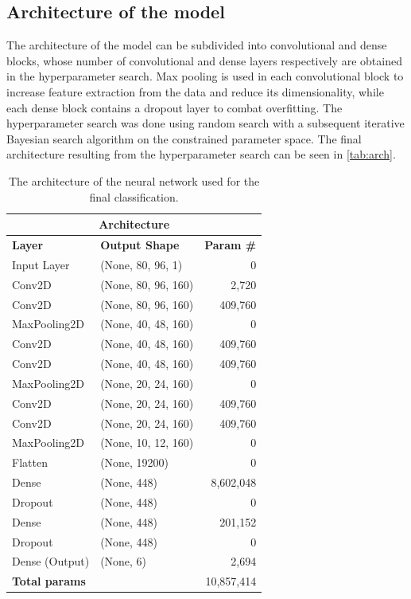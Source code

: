 \subsection{Architecture of the model}
\label{sec:keinbockmehr}
The architecture of the model can be subdivided into convolutional and dense blocks, whose number of convolutional and dense layers respectively are obtained in the hyperparameter search. Max pooling is used in each convolutional block to increase feature extraction from the data and reduce its dimensionality, while each dense block contains a dropout layer to combat overfitting. The hyperparameter search was done using random search with a subsequent iterative Bayesian search algorithm on the constrained parameter space. The final architecture resulting from the hyperparameter search can be seen in \autoref{tab:arch}.
\begin{table}[H]
    \caption{The architecture of the neural network used for the final classification.}
    \vspace{0.2cm}
    \label{tab:arch}
    \centering
    \begin{adjustbox}{max width=\textwidth}
    \begin{tabular}{l|l|r}
        \toprule
        \multicolumn{3}{c}{\textbf{Architecture}} \\
        \midrule
        \textbf{Layer} & \textbf{Output Shape} & \textbf{Param \#} \\
        \midrule
 Input Layer & (None, 80, 96, 1) & 0 \\
 Conv2D & (None, 80, 96, 160) & 2,720 \\
 Conv2D & (None, 80, 96, 160) & 409,760 \\
 MaxPooling2D & (None, 40, 48, 160) & 0 \\
 Conv2D & (None, 40, 48, 160) & 409,760 \\
 Conv2D & (None, 40, 48, 160) & 409,760 \\
 MaxPooling2D & (None, 20, 24, 160) & 0 \\
 Conv2D & (None, 20, 24, 160) & 409,760 \\
 Conv2D & (None, 20, 24, 160) & 409,760 \\
 MaxPooling2D & (None, 10, 12, 160) & 0 \\
 Flatten & (None, 19200) & 0 \\
 Dense & (None, 448) & 8,602,048 \\
 Dropout & (None, 448) & 0 \\
 Dense & (None, 448) & 201,152 \\
 Dropout & (None, 448) & 0 \\
 Dense (Output) & (None, 6) & 2,694 \\
        \midrule
        \multicolumn{2}{l|}{\textbf{Total params}} & 10,857,414 \\
        \bottomrule
    \end{tabular}
    \end{adjustbox}
\end{table}
